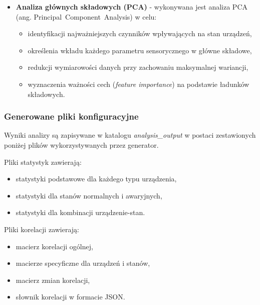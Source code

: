 \begin{itemize}
    \item \textbf{Analiza głównych składowych (PCA)} - wykonywana jest analiza PCA (ang. \mbox{Principal Component Analysis}) \cite{jolliffe_pca} w celu:
    
\begin{itemize}
    \item identyfikacji najważniejszych czynników wpływających na stan urządzeń,
    \item określenia wkładu każdego parametru sensorycznego w główne składowe,
    \item redukcji wymiarowości danych przy zachowaniu maksymalnej wariancji,
    \item wyznaczenia ważności cech (\textit{feature importance}) na podstawie ładunków składowych.
\end{itemize}

\end{itemize}

\newpage

\subsubsection{Generowane pliki konfiguracyjne}

Wyniki analizy są zapisywane w katalogu \textit{analysis\_output} w postaci zestawionych poniżej plików wykorzystywanych przez generator.

\vspace{0.3em}

Pliki statystyk zawierają:
\begin{itemize}
    \item statystyki podstawowe dla każdego typu urządzenia,
    \item statystyki dla stanów normalnych i awaryjnych,
    \item statystyki dla kombinacji urządzenie-stan.
\end{itemize}

\vspace{0.3em}

Pliki korelacji zawierają:
\begin{itemize}
    \item macierz korelacji ogólnej,
    \item macierze specyficzne dla urządzeń i stanów,
    \item macierz zmian korelacji,
    \item słownik korelacji w formacie JSON.
\end{itemize}

